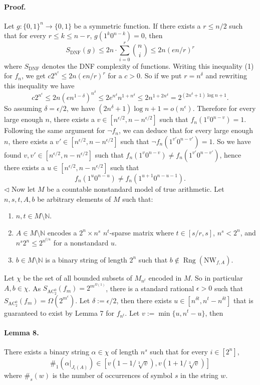 \paragraph{Proof.} Let $g:\{0,1\}^n\to\{0,1\}$ be a symmetric function. If there exists a $r\leq n/2$ such that for every $r\leq k\leq n-r$, $g(1^k0^{n-k})=0$, then
\[S_{\mathrm{DNF}}(g)\leq2n\cdot\sum_{i=0}^r\binom ni\leq2n(en/r)^r\]
where $S_{\mathrm{DNF}}$ denotes the DNF complexity of functions. Writing this inequality (1) for $f_n$, we get $c2^{n^\epsilon}\leq2n(en/r)^r$ for a $c>0$. So if we put $r=n^\delta$ and rewriting this inequality we have
\[c2^{n^\epsilon}\leq2n(en^{1-\delta})^{n^\delta}\leq2e^{n^\delta}n^{1+n^\delta}\leq2n^{1+2n^\delta}=2^{(2n^\delta+1)\log n+1}.\]
So assuming $\delta=\epsilon/2$, we have $(2n^\delta+1)\log n+1=o(n^\epsilon)$. Therefore for every large enough $n$, there exists a $v\in[n^{\epsilon/2},n-n^{\epsilon/2}]$ such that $f_n(1^v0^{n-v})=1$. Following the same argument for $\neg f_n$, we can deduce that for every large enough $n$, there exists a $v'\in[n^{\epsilon/2},n-n^{\epsilon/2}]$ such that $\neg f_n(1^{v'}0^{n-v'})=1$. So we have found $v,v'\in[n^{\epsilon/2},n-n^{\epsilon/2}]$ such that $f_n(1^v0^{n-v})\neq f_n(1^{v'}0^{n-v'})$, hence there exists a $u\in[n^{\epsilon/2},n-n^{\epsilon/2}]$ such that
\[f_n(1^u0^{n-u})\neq f_n(1^{u+1}0^{n-u-1}).\]\hfill$\triangleleft$
Now let $M$ be a countable nonstandard model of true arithmetic. Let $n,s,t,A,b$ be arbitrary elements of $M$ such that:
\begin{enumerate}
\item $n,t\in M\setminus\mathbb N$.
\item $A\in M\setminus\mathbb N$ encodes a $2^n\times n^s$ $n^t$-sparse matrix where $t\in[s/r,s]$, $n^s<2^n$, and $n^s2^n\leq2^{n^{t/u}}$ for a nonstandard $u$.
\item $b\in M\setminus\mathbb N$ is a binary string of length $2^n$ such that $b\notin\operatorname{Rng}(\mathrm{NW}_{f,A})$.
\end{enumerate}
Let $\chi$ be the set of all bounded subsets of $M_{n^t}$ encoded in $M$. So in particular $A,b\in\chi$.
As $S_{\mathrm{AC}_2^0}(f_m)=2^{m^{\Omega(1)}}$, there is a standard rational $\epsilon>0$ such that $S_{\mathrm{AC}_2^0}(f_m)=\Omega(2^{m^\epsilon})$. Let $\delta:=\epsilon/2$, then there exists $u\in[n^{\delta t},n^t-n^{\delta t}]$ that is guaranteed to exist by Lemma 7 for $f_{n^t}$. Let $v:=\min\{u,n^t-u\}$, then
\paragraph{Lemma 8.} There exists a binary string $\alpha\in\chi$ of length $n^s$ such that for every $i\in[2^n]$,
\[\#_1(\alpha|_{J_i(A)})\in[v(1-1/\sqrt[3]v),v(1+1/\sqrt[3]v)]\]
where $\#_s(w)$ is the number of occurrences of symbol $s$ in the string $w$.
